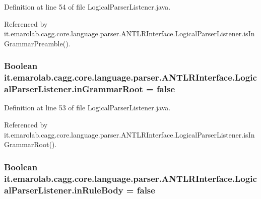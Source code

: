 Definition at line 54 of file Logical\-Parser\-Listener.\-java.



Referenced by it.\-emarolab.\-cagg.\-core.\-language.\-parser.\-A\-N\-T\-L\-R\-Interface.\-Logical\-Parser\-Listener.\-is\-In\-Grammar\-Preamble().

\hypertarget{classit_1_1emarolab_1_1cagg_1_1core_1_1language_1_1parser_1_1ANTLRInterface_1_1LogicalParserListener_a9782be29fa421c24634e4be711938619}{
\subsubsection[{in\-Grammar\-Root}]{\setlength{\rightskip}{0pt plus 5cm}Boolean it.\-emarolab.\-cagg.\-core.\-language.\-parser.\-A\-N\-T\-L\-R\-Interface.\-Logical\-Parser\-Listener.\-in\-Grammar\-Root = false\hspace{0.3cm}{\ttfamily [private]}}}\label{classit_1_1emarolab_1_1cagg_1_1core_1_1language_1_1parser_1_1ANTLRInterface_1_1LogicalParserListener_a9782be29fa421c24634e4be711938619}


Definition at line 53 of file Logical\-Parser\-Listener.\-java.



Referenced by it.\-emarolab.\-cagg.\-core.\-language.\-parser.\-A\-N\-T\-L\-R\-Interface.\-Logical\-Parser\-Listener.\-is\-In\-Grammar\-Root().

\hypertarget{classit_1_1emarolab_1_1cagg_1_1core_1_1language_1_1parser_1_1ANTLRInterface_1_1LogicalParserListener_a06fbf6f53eff50aae6bf351f4caf8e83}{
\subsubsection[{in\-Rule\-Body}]{\setlength{\rightskip}{0pt plus 5cm}Boolean it.\-emarolab.\-cagg.\-core.\-language.\-parser.\-A\-N\-T\-L\-R\-Interface.\-Logical\-Parser\-Listener.\-in\-Rule\-Body = false\hspace{0.3cm}{\ttfamily [private]}}}\label{classit_1_1emarolab_1_1cagg_1_1core_1_1language_1_1parser_1_1ANTLRInterface_1_1LogicalParserListener_a06fbf6f53eff50aae6bf351f4caf8e83}



